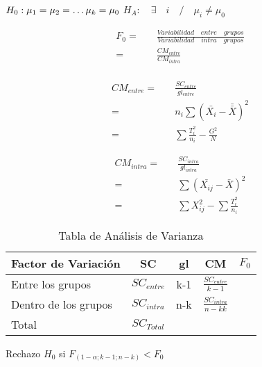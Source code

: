 $
H_0: \mu_1=\mu_2=\hdots \mu_k=\mu_0 \\
$
$
H_A:\quad \exists\quad i\quad / \quad \mu_i \neq \mu_0
$

\begin{align*}
F_0  =& \quad \frac{Variabilidad \quad entre \quad grupos}{Variabilidad \quad intra \quad grupos}\\
    =& \quad \frac{CM_{entre} }{CM_{intra}}\\
\end{align*}
\begin{minipage}[b]{\textwidth}
    \begin{minipage}[b]{0.5 \textwidth}
\begin{align*}
CM_{entre}=&\quad\frac{SC_{entre}}{gl_{entre}}\\
=&\quad n_i\sum(\bar{X_i}-\bar{\bar{X}})^2\\
=&\quad \sum \frac{T^2_i}{n_i}-\frac{G^2}{N}
\end{align*}    

    \end{minipage} \hfill
    \begin{minipage}[b]{0.5 \textwidth}
\begin{align*}
CM_{intra}=&\quad\frac{SC_{intra}}{gl_{intra}}\\
=&\quad \sum(\bar{X_{ij}}-\bar{X})^2\\
=&\quad \sum X^2_{ij}-\sum \frac{T^2_i}{n_i}
\end{align*}    
    \end{minipage}
    \end{minipage}
    
    

          \begin{table}[h!]
         \centering
         \begin{tabular}{|l|c|c|c|c|} \hline
             Factor de Variación & SC & gl & CM & $F_0$\\ \hline
             Entre los grupos & $SC_{entre}$ &k-1&$\frac{SC_{entre}}{k-1}$ &\\
             Dentro de los grupos & $SC_{intra}$ &n-k&$\frac{SC_{intra}}{n-kk}$ & \\ \hline
             Total & $SC_{Total}$& & & \\ \hline
             
         \end{tabular}
         \caption{Tabla de Análisis de Varianza}
         \label{tab:my_label}
     \end{table}


Rechazo $H_0$ si $F_{(1-\alpha; k-1; n-k)} < F_0$
